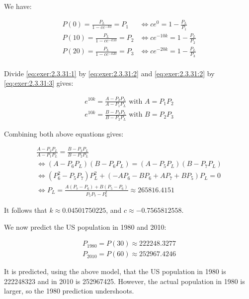 \documentclass[../../../../Assignments]{subfiles}
\begin{document}
\begin{solution}
    We have:

    \begin{align*}
         P(0) = \frac{P_L}{1 - ce^{-k0}}  = P_1 &\iff ce^0 = 1 - \frac{P_L}{P_1}    \tag{1}\label{eq:exer:2.3.31:1} \\
        P(10) = \frac{P_L}{1 - ce^{-k10}} = P_2 &\iff ce^{-10k} = 1 - \frac{P_L}{P_2} \tag{2}\label{eq:exer:2.3.31:2} \\
        P(20) = \frac{P_L}{1 - ce^{-k20}} = P_3 &\iff ce^{-20k} = 1 - \frac{P_L}{P_3} \tag{3}\label{eq:exer:2.3.31:3} \\
    \end{align*}

    Divide \eqref{eq:exer:2.3.31:1} by \eqref{eq:exer:2.3.31:2} and
    \eqref{eq:exer:2.3.31:2} by \eqref{eq:exer:2.3.31:3} gives:

    \begin{gather*}
        e^{10k} = \frac{A - P_2 P_L}{A - P_1 P_L} \text{ with } A = P_1 P_2 \\
        e^{10k} = \frac{B - P_3 P_L}{B - P_2 P_L} \text{ with } B = P_2 P_3
    \end{gather*}

    Combining both above equations gives:

    \begin{gather*}
        \frac{A - P_2 P_L}{A - P_1 P_L} = \frac{B - P_3 P_L}{B - P_2 P_L} \\
        \iff (A - P_6 P_L)(B - P_6 P_L) = (A - P_5 P_L) (B - P_7 P_L) \\
        \iff (P_6^2 - P_5 P_7) P_L^2 + (-AP_6 - BP_6 + AP_7 + BP_5) P_L = 0 \\
        \iff P_L = \frac{A(P_7 - P_6) + B(P_5 - P_6)}{P_5 P_7 - P_6^2} \approx \num{265816.4151}
    \end{gather*}

    It follows that \(k \approx \num{0.04501750225}\), and \(c \approx
    \num{-0.7565812558}\).

    We now predict the US population in 1980 and 2010:

    \begin{gather*}
        P_{1980} = P(30) \approx \num{222248.3277} \\
        P_{2010} = P(60) \approx \num{252967.4246}
    \end{gather*}

    It is predicted, using the above model, that the US population in 1980 is
    \num{222248323} and in 2010 is \num{252967425}. However, the actual
    population in 1980 is larger, so the 1980 prediction undershoots.
\end{solution}
\end{document}
